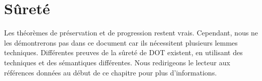 

\section{Sûreté}

Les théorèmes de préservation et de progression
restent vrais. Cependant, nous ne les démontrerons pas dans ce document car ils
nécessitent plusieurs lemmes techniques. Différentes preuves de la sûreté de DOT
existent, en utilisant des techniques et des sémantiques différentes. Nous
redirigeons le lecteur aux références données au début de ce chapitre pour plus d'informations.
